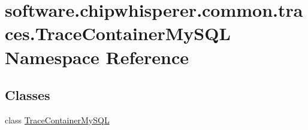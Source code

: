 \hypertarget{namespacesoftware_1_1chipwhisperer_1_1common_1_1traces_1_1TraceContainerMySQL}{}\section{software.\+chipwhisperer.\+common.\+traces.\+Trace\+Container\+My\+S\+Q\+L Namespace Reference}
\label{namespacesoftware_1_1chipwhisperer_1_1common_1_1traces_1_1TraceContainerMySQL}
\subsection*{Classes}
\begin{DoxyCompactItemize}
\item 
class \hyperlink{classsoftware_1_1chipwhisperer_1_1common_1_1traces_1_1TraceContainerMySQL_1_1TraceContainerMySQL}{Trace\+Container\+My\+S\+Q\+L}
\end{DoxyCompactItemize}
